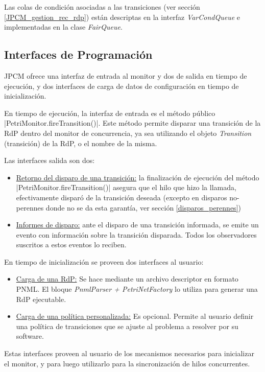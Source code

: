Las colas de condición asociadas a las transiciones (ver sección
\ref{JPCM_gestion_rec_rdp}) están descriptas en la interfaz
\textit{VarCondQueue} e implementadas en la clase \textit{FairQueue}.


\subsection{Interfaces de Programación}

JPCM ofrece una interfaz de entrada al monitor y dos de salida en tiempo de
ejecución, y dos interfaces de carga de datos de configuración en tiempo de
inicialización.

En tiempo de ejecución, la interfaz de entrada es el método público 
|PetriMonitor.fireTransition()|. Este método permite disparar una
transición de la RdP dentro del monitor de concurrencia, ya sea utilizando el
objeto \textit{Transition} (transición) de la RdP, o el nombre de la misma.

Las interfaces salida son dos:
\begin{itemize}
  \item \underline{Retorno del disparo de una transición:} la finalización de
  ejecución del método |PetriMonitor.fireTransition()| asegura que el
  hilo que hizo la llamada, efectivamente disparó de la transición deseada
  (excepto en disparos no-perennes donde no se da esta garantía, ver sección
  \ref{disparos_perennes})
  \item \underline{Informes de disparo:} ante el disparo de una
  transición informada, se emite un evento con información sobre la transición
  disparada. Todos los observadores suscritos a estos eventos lo reciben.
\end{itemize}

En tiempo de inicialización se proveen dos interfaces al usuario:
\begin{itemize} 
  \item \underline{Carga de una RdP:} Se hace mediante un archivo descriptor
  en formato PNML. El bloque \textit{PnmlParser + PetriNetFactory} lo utiliza
  para generar una RdP ejecutable.
  \item \underline{Carga de una política personalizada:} Es opcional. Permite
  al usuario definir una política de transiciones que se ajuste al problema a
  resolver por su software.
\end{itemize}

Estas interfaces proveen al usuario de los mecanismos necesarios para
inicializar el monitor, y para luego utilizarlo para la sincronización de hilos
concurrentes.

